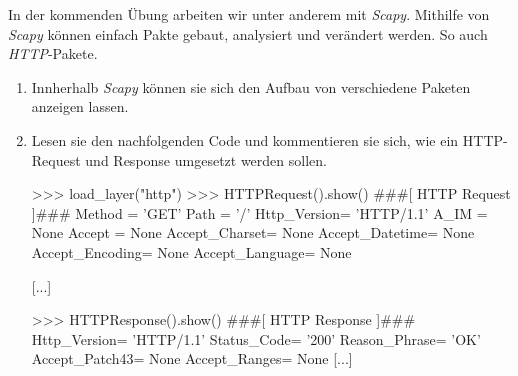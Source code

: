 \documentclass[paper=a4,fontsize=11pt]{scrartcl}%
\numberwithin{equation}{section}
\begin{document}
In der kommenden Übung arbeiten wir unter anderem mit \emph{Scapy}. Mithilfe von \emph{Scapy} können einfach Pakte gebaut, analysiert und verändert werden. So auch \emph{HTTP}-Pakete.
\begin{enumerate}
	\item Innherhalb \emph{Scapy} können sie sich den Aufbau von verschiedene Paketen anzeigen lassen.
	\item Lesen sie den nachfolgenden Code und kommentieren sie sich, wie ein HTTP-Request und Response umgesetzt werden sollen.
	\begin{python}
>>> load_layer("http")
>>> HTTPRequest().show()
###[ HTTP Request ]### 
  Method    = 'GET'
  Path      = '/'
  Http_Version= 'HTTP/1.1'
  A_IM      = None
  Accept    = None
  Accept_Charset= None
  Accept_Datetime= None
  Accept_Encoding= None
  Accept_Language= None

  [...]
\end{python} 


\begin{python}
>>> HTTPResponse().show()
###[ HTTP Response ]###
  Http_Version= 'HTTP/1.1'
  Status_Code= '200'
  Reason_Phrase= 'OK'
  Accept_Patch43= None
  Accept_Ranges= None
  [...]
\end{python}
\end{enumerate}
\end{document}
